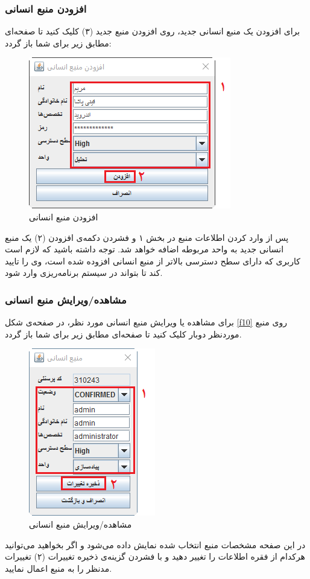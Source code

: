 \subsubsection{افزودن منبع انسانی}
برای افزودن یک منبع انسانی جدید، روی افزودن منبع جدید (۳) کلیک کنید تا صفحه‌ای مطابق زیر برای شما باز گردد:
	\begin{figure}[H]
		\centering
		\includegraphics[scale=0.9]{img/manual/addHRess}
		\caption{افزودن منبع انسانی}
	\end{figure}
پس از وارد کردن اطلاعات منبع در بخش ۱ و فشردن دکمه‌ی افزودن (۲) یک منبع انسانی جدید به واحد مربوطه اضافه خواهد شد. توجه داشته باشید که لازم است کاربری که دارای سطح دسترسی بالاتر از منبع انسانی افزوده شده است، وی را تایید کند تا بتواند در سیستم برنامه‌ریزی وارد شود.

\subsubsection{مشاهده/ویرایش منبع انسانی}
برای مشاهده یا ویرایش منبع انسانی مورد نظر، در صفحه‌ی شکل
\ref{f10}
 روی منبع موردنظر دوبار کلیک کنید تا صفحه‌ای مطابق زیر برای شما باز گردد.

	\begin{figure}[H]
		\centering
		\includegraphics[scale=0.9]{img/manual/editHRess}
		\caption{مشاهده/ویرایش منبع انسانی}
		\label{f20}
	\end{figure} 
در این صفحه مشخصات منبع انتخاب شده نمایش داده می‌شود و اگر بخواهید می‌توانید هرکدام از فقره اطلاعات را تغییر دهید و با فشردن گزینه‌ی ذخیره تغییرات (۲) تغییرات مدنظر را به منبع اعمال نمایید.

